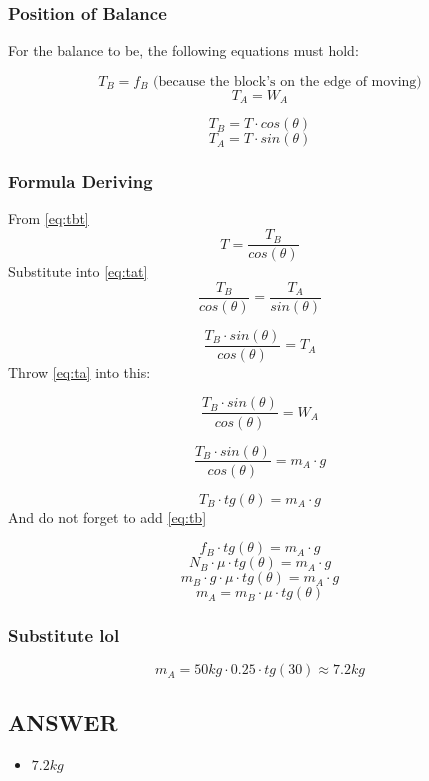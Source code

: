 \bigbreak \subsubsection*{Position of Balance}
For the balance to be, the following equations must hold:

\begin{equation}
    \label{eq:tb}
    T_B = f_B \text{ (because the block's on the edge of moving)}
\end{equation}
\begin{equation}
    \label{eq:ta}
    T_A = W_A
\end{equation}

\begin{equation}
    \label{eq:tbt}
    T_B = T \cdot cos(\theta)
\end{equation}
\begin{equation}
    \label{eq:tat}
    T_A = T \cdot sin(\theta)
\end{equation}

\subsubsection*{Formula Deriving}

From \ref{eq:tbt} $$ T = \frac{T_B}{cos(\theta)} $$
Substitute into \ref{eq:tat} $$ \frac{T_B}{cos(\theta)} = \frac{T_A}{sin(\theta)} $$

$$ \frac{T_B \cdot sin(\theta)}{cos(\theta)} = T_A $$
Throw \ref{eq:ta} into this:

$$ \frac{T_B \cdot sin(\theta)}{cos(\theta)} = W_A $$

$$ \frac{T_B \cdot sin(\theta)}{cos(\theta)} = m_A \cdot g $$

$$ T_B \cdot tg(\theta) = m_A \cdot g $$
And do not forget to add \ref{eq:tb}

$$ f_B \cdot tg(\theta) = m_A \cdot g $$
$$ N_B \cdot \mu \cdot tg(\theta) = m_A \cdot g $$
$$ m_B \cdot g \cdot \mu \cdot tg(\theta) = m_A \cdot g $$
$$ m_A = m_B \cdot \mu \cdot tg(\theta) $$

\subsubsection*{Substitute lol}

$$ m_A =  50kg \cdot 0.25 \cdot tg(30) \approx \boxed{7.2kg} $$

\vfill \subsection*{ANSWER}
\begin{itemize}
    \item $7.2kg$
\end{itemize}
